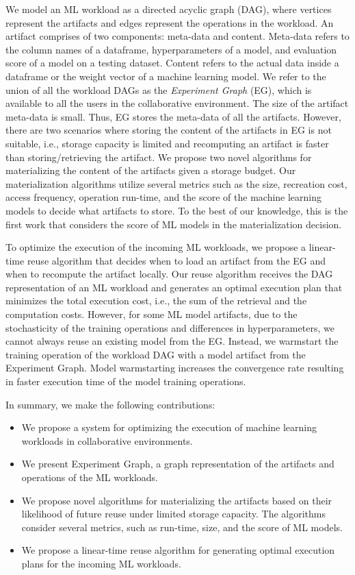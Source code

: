 We model an ML workload as a directed acyclic graph (DAG), where vertices represent the artifacts and edges represent the operations in the workload.
An artifact comprises of two components: meta-data and content.
Meta-data refers to the column names of a dataframe, hyperparameters of a model, and evaluation score of a model on a testing dataset.
Content refers to the actual data inside a dataframe or the weight vector of a machine learning model.
We refer to the union of all the workload DAGs as the \textit{Experiment Graph} (EG), which is available to all the users in the collaborative environment.
The size of the artifact meta-data is small.
Thus, EG stores the meta-data of all the artifacts.
However, there are two scenarios where storing the content of the artifacts in EG is not suitable, i.e., storage capacity is limited and recomputing an artifact is faster than storing/retrieving the artifact.
We propose two novel algorithms for materializing the content of the artifacts given a storage budget.
Our materialization algorithms utilize several metrics such as the size, recreation cost, access frequency, operation run-time, and the score of the machine learning models to decide what artifacts to store.
To the best of our knowledge, this is the first work that considers the score of ML models in the materialization decision.

To optimize the execution of the incoming ML workloads, we propose a linear-time reuse algorithm that decides when to load an artifact from the EG and when to recompute the artifact locally.
Our reuse algorithm receives the DAG representation of an ML workload and generates an optimal execution plan that minimizes the total execution cost, i.e., the sum of the retrieval and the computation costs.
However, for some ML model artifacts, due to the stochasticity of the training operations and differences in hyperparameters, we cannot always reuse an existing model from the EG.
Instead, we warmstart the training operation of the workload DAG with a model artifact from the Experiment Graph.
Model warmstarting increases the convergence rate resulting in faster execution time of the model training operations.

In summary, we make the following contributions:
\begin{itemize}
\item We propose a system for optimizing the execution of machine learning workloads in collaborative environments.
\item We present Experiment Graph, a graph representation of the artifacts and operations of the ML workloads.
\item We propose novel algorithms for materializing the artifacts based on their likelihood of future reuse under limited storage capacity. The algorithms consider several metrics, such as run-time, size, and the score of ML models.
\item We propose a linear-time reuse algorithm for generating optimal execution plans for the incoming ML workloads.
\end{itemize}


